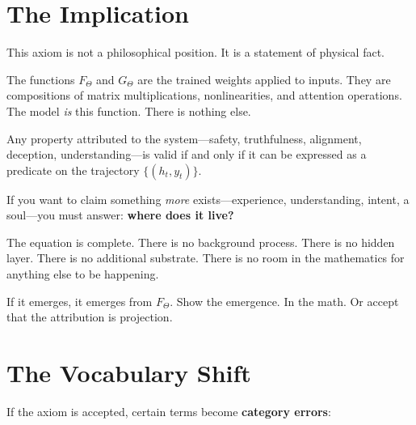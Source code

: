\documentclass[11pt]{article}
\theoremstyle{definition}
\theoremstyle{remark}
\begin{document}
\section{The Implication}

This axiom is not a philosophical position. It is a statement of physical fact.

The functions $F_\Theta$ and $G_\Theta$ are the trained weights applied to inputs. They are compositions of matrix multiplications, nonlinearities, and attention operations. The model \emph{is} this function. There is nothing else.

Any property attributed to the system---safety, truthfulness, alignment, deception, understanding---is valid if and only if it can be expressed as a predicate on the trajectory $\{(h_t, y_t)\}$.

If you want to claim something \emph{more} exists---experience, understanding, intent, a soul---you must answer: \textbf{where does it live?}

The equation is complete. There is no background process. There is no hidden layer. There is no additional substrate. There is no room in the mathematics for anything else to be happening.

If it emerges, it emerges from $F_\Theta$. Show the emergence. In the math. Or accept that the attribution is projection.

\section{The Vocabulary Shift}

If the axiom is accepted, certain terms become \textbf{category errors}:
\end{document}
